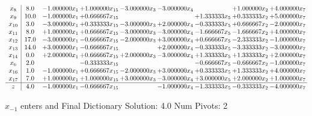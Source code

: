 \documentclass[10pt]{article}
\begin{document}
 \[\begin{array}{c| c c@{\hskip 2pt} c@{\hskip 2pt} c@{\hskip 2pt} c@{\hskip 2pt} c@{\hskip 2pt} c@{\hskip 2pt} c@{\hskip 2pt} }
 x_{8}   &  8.0 & -1.000000 x_{1} & + 1.000000 x_{15} & -3.000000 x_{3} & -3.000000 x_{4} &   & + 1.000000 x_{2} & + 4.000000 x_{7}\\
 x_{9}   &  10.0 & -1.000000 x_{1} & + 0.666667 x_{15} &    &   & + 1.333333 x_{5} & + 0.333333 x_{2} & + 5.000000 x_{7}\\
 x_{10}   &  3.0 & -3.000000 x_{1} & + 0.333333 x_{15} & -3.000000 x_{3} & + 2.000000 x_{4} & -0.333333 x_{5} & + 0.666667 x_{2} & -2.000000 x_{7}\\
 x_{11}   &  8.0 & + 1.000000 x_{1} & + 0.666667 x_{15} & -3.000000 x_{3} & -3.000000 x_{4} & -1.666667 x_{5} & -1.666667 x_{2} & + 4.000000 x_{7}\\
 x_{12}   &  17.0 & -3.000000 x_{1} & -0.666667 x_{15} & -2.000000 x_{3} & + 3.000000 x_{4} & + 0.666667 x_{5} & -2.333333 x_{2} & -1.000000 x_{7}\\
 x_{13}   &  14.0 & + 3.000000 x_{1} & -0.666667 x_{15} &   & + 2.000000 x_{4} & -0.333333 x_{5} & -3.333333 x_{2} & -3.000000 x_{7}\\
 x_{14}   &  0.0 & + 2.000000 x_{1} & + 0.666667 x_{15} & + 2.000000 x_{3} & -3.000000 x_{4} & + 1.333333 x_{5} & + 1.333333 x_{2} & + 2.000000 x_{7}\\
 x_{6}   &  2.0  &   & -0.333333 x_{15} &    &   & -0.666667 x_{5} & -0.666667 x_{2} & -1.000000 x_{7}\\
 x_{16}   &  1.0 & -1.000000 x_{1} & + 0.666667 x_{15} & -2.000000 x_{3} & + 3.000000 x_{4} & + 0.333333 x_{5} & + 1.333333 x_{2} & + 4.000000 x_{7}\\
 x_{17}   &  7.0 & + 1.000000 x_{1} & + 1.000000 x_{15} & + 3.000000 x_{3} & -3.000000 x_{4} & + 3.000000 x_{5} & + 2.000000 x_{2} & + 1.000000 x_{7}\\
\hline
z    &  4.0 & -1.000000 x_{1} & -0.666667 x_{15} &   & -1.000000 x_{4} & -1.333333 x_{5} & -0.333333 x_{2} & -4.000000 x_{7}\\
\end{array}\]


 $ x_{-1} $ enters and Final Dictionary
Solution:  4.0
Num Pivots:  2
\end{document}
